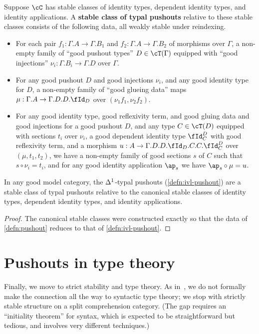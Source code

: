 \documentclass[referee]{psp}
\let\C\cC
\let\T\cT
\let\Id\fId
\begin{document}
\begin{defn}\label{defn:pushout}
  Suppose $\C$ has stable classes of identity types, dependent identity types, and identity applications.
  A \textbf{stable class of typal pushouts} relative to these stable classes consists of the following data, all weakly stable under reindexing.
  \begin{itemize}
  \item For each pair $f_1:\Gamma.A\to \Gamma.B_1$ and $f_2:\Gamma.A\to \Gamma.B_2$ of morphisms over $\Gamma$, a non-empty family of ``good pushout types'' $D\in\T(\Gamma)$ equipped with ``good injections'' $\nu_i : \Gamma.B_i \to \Gamma.D$ over $\Gamma$.
  \item For any good pushout $D$ and good injections $\nu_i$, and any good identity type for $D$, a non-empty family of ``good glueing data'' maps $\mu : \Gamma.A \to \Gamma.D.D.\Id_D$ over $(\nu_1 f_1,\nu_2 f_2)$.
  \item For any good identity type, good reflexivity term, and good gluing data and good injections for a good pushout $D$, and any type $C\in\T(D)$ equipped with sections $t_i$ over $\nu_i$, a good dependent identity type $\Id^D_C$ with good reflexivity term, and a morphism $u:A\to \Gamma.D.D.\Id_D.C.C.\Id^D_C$ over $(\mu,t_1,t_2)$, we have a non-empty family of good sections $s$ of $C$ such that $s \circ \nu_i = t_i$, and for any good identity application $\ap_s$ we have $\ap_s \circ \mu = u$.
  \end{itemize}
\end{defn}

\begin{thm}\label{thm:model-pushout}
  In any good model category, the ${\Delta^1}$-typal pushouts (\cref{defn:ivl-pushout}) are a stable class of typal pushouts relative to the canonical stable classes of identity types, dependent identity types, and identity applications.
\end{thm}
\begin{proof}
  The canonical stable classes were constructed exactly so that the data of \cref{defn:pushout} reduces to that of \cref{defn:ivl-pushout}.
\end{proof}


\section{Pushouts in type theory}
\label{sec:pushouts-type-theory}

Finally, we move to strict stability and type theory.
As in~\cite{lw:localuniv}, we do not formally make the connection all the way to syntactic type theory; we stop with strictly stable structure on a split comprehension category.
(The gap requires an ``initiality theorem'' for syntax, which is expected to be straightforward but tedious, and involves very different techniques.)
\end{document}
